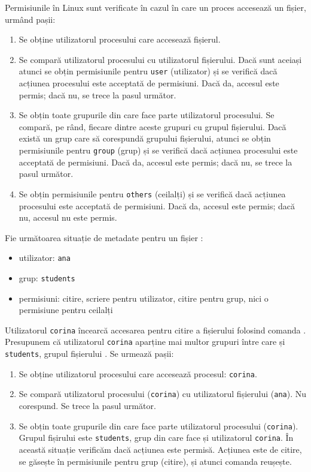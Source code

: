 Permisiunile în Linux sunt verificate în cazul în care un proces accesează un
fișier, urmând pașii:

\begin{enumerate}
  \item Se obține utilizatorul procesului care accesează fișierul.
  \item Se compară utilizatorul procesului cu utilizatorul fișierului.
    Dacă sunt aceiași atunci se obțin permisiunile pentru \texttt{user}
          (utilizator) și se verifică dacă acțiunea procesului este
          acceptată de permisiuni. Dacă da, accesul este permis; dacă nu,
          se trece la pasul următor.
  \item Se obțin toate grupurile din care face parte utilizatorul
          procesului. Se compară, pe rând, fiecare dintre aceste grupuri
          cu grupul fișierului. Dacă există un grup care să corespundă
          grupului fișierului, atunci se obțin permisiunile pentru \texttt{group}
          (grup) și se verifică dacă acțiunea procesului este acceptată de
          permisiuni. Dacă da, accesul este permis; dacă nu, se trece la
          pasul următor.
  \item Se obțin permisiunile pentru \texttt{others} (ceilalți) și se verifică dacă
          acțiunea procesului este acceptată de permisiuni. Dacă da,
          accesul este permis; dacă nu, accesul nu este permis.
\end{enumerate}

Fie următoarea situație de metadate pentru un fișier :

\begin{itemize}
  \item utilizator: \texttt{ana}
  \item grup: \texttt{students}
  \item permisiuni: citire, scriere pentru utilizator, citire pentru grup,
    nici o permisiune pentru ceilalți
\end{itemize}

Utilizatorul \texttt{corina} încearcă accesarea pentru citire a fișierului folosind comanda . Presupunem că utilizatorul \texttt{corina} aparține mai multor grupuri între care și \texttt{students}, grupul fișierului . Se urmează pașii:

\begin{enumerate}
  \item Se obține utilizatorul procesului care accesează procesul: \texttt{corina}.
  \item Se compară utilizatorul procesului (\texttt{corina}) cu utilizatorul
    fișierului (\texttt{ana}). Nu corespund. Se trece la pasul următor.
  \item Se obțin toate grupurile din care face parte utilizatorul
    procesului (\texttt{corina}). Grupul fișirului  este \texttt{students}, grup din care face și utilizatorul \texttt{corina}. În această situație verificăm dacă acțiunea este
    permisă. Acțiunea este de citire, se găsește în permisiunile
    pentru grup (citire), și atunci comanda  reușește.
\end{enumerate}


